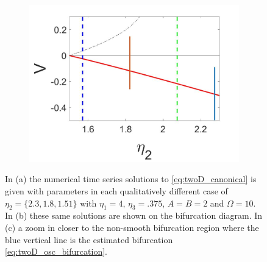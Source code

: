 \begin{figure}[H]
\begin{subfigure}{.5\textwidth}
 \includegraphics[width=\linewidth]{twoD/osc_bif_diagram_zoom.jpg}
 \caption{}
\end{subfigure}
\caption{In (a) the numerical time series solutions to \eqref{eq:twoD_canonical} is given with parameters in each qualitatively different case of $\eta_2=\{2.3,1.8,1.51\}$ with $\eta_1=4$, $\eta_3=.375$, $A=B=2$ and $\Omega = 10$. In (b) these same solutions are shown on the bifurcation diagram. In (c) a zoom in closer to the non-smooth bifurcation region where the blue vertical line is the estimated bifurcation \eqref{eq:twoD_osc_bifurcation}.}
\label{fig:twoD_osc_Vnumerics}
\end{figure}

